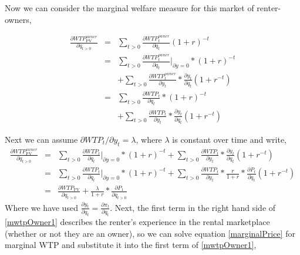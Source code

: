 \documentclass[ecta,nameyear,draft]{econsocart}
\theoremstyle{plain}
\theoremstyle{remark}
\begin{document}
Now we can consider the marginal welfare measure for this market of renter-owners,

\begin{eqnarray}
	\frac{\partial \mathit{WTP}^{\mathit{owner}}_{\mathrm{PV}}}{\partial q_{t>0}}&=&\sum_{t>0} \frac{\partial \mathit{WTP}^{\mathit{owner}}_t}{\partial q_t}(1+r)^{-t} \nonumber\\
	&=&\sum_{t>0}\frac{\partial \mathit{WTP}_t^{\mathit{owner}}}{\partial q_t}|_{\partial y=0}*(1+r)^{-t} \nonumber\\
	&& +\sum_{t>0}\frac{\partial \mathit{WTP}_t^{\mathit{owner}}}{\partial y_t}*\frac{\partial y_t}{\partial q_t}(1+r^{-t}) \nonumber\\
	&=&\sum_{t>0}\frac{\partial \mathit{WTP}_t}{\partial q_t}*(1+r)^{-t}\nonumber\\
	&& +\sum_{t>0}\frac{\partial \mathit{WTP}_t}{\partial y_t}*\frac{\partial y_t}{\partial q_t}(1+r^{-t}) \nonumber
\end{eqnarray}

Next we can assume $\partial \mathit{WTP}_t/\partial y_t=\lambda$, where $\lambda$ is constant over time and write,
\begin{eqnarray}
	\frac{\partial \mathit{WTP}^{\mathit{owner}}_{\mathrm{PV}}}{\partial q_{t>0}} 
	&=& \sum_{t>0}\frac{\partial \mathit{WTP}_t}{\partial q_t}|_{\partial y=0}*(1+r)^{-t} +
	\sum_{t>0}\frac{\partial \mathit{WTP}_t}{\partial y_t}*\frac{\partial y_t}{\partial q_t}(1+r^{-t}) \label{mwtpOwner0}\\
	&=& \sum_{t>0}\frac{\partial \mathit{WTP}_t}{\partial q_t}|_{\partial y=0}*(1+r)^{-t} +
	 \sum_{t>0}\frac{\partial \mathit{WTP}_t}{\partial y_t}*\frac{r}{1+r}*\frac{\partial P_t}{\partial q_t}(1+r^{-t}) \nonumber\\
	&=&\frac{\partial \mathit{WTP_{\mathrm{PV}}}}{\partial q_{t>0}} + \frac{\lambda}{1+r}*\frac{\partial P_1}{\partial q_{t>0}} \label{mwtpOwner1}
\end{eqnarray}
Where we have used $\frac{\partial y_t}{\partial q_t}=\frac{\partial \pi_t}{\partial q_t}$. Next, the first term in the right hand side of \ref{mwtpOwner1} describes the renter's experience in the rental marketplace (whether or not they are an owner), so we can solve equation \ref{marginalPrice} for marginal WTP and substitute it into the first term of \ref{mwtpOwner1},
\end{document}
